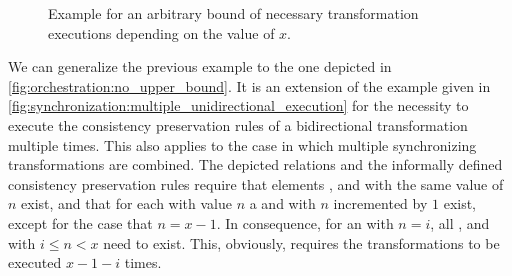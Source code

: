 \begin{figure}
    \centering
    
    \caption[Example for arbitrary bounds of transformation execution]{Example for an arbitrary bound of necessary transformation executions depending on the value of $x$.}
    \label{fig:orchestration:no_upper_bound}
\end{figure}

We can generalize the previous example to the one depicted in \autoref{fig:orchestration:no_upper_bound}.
It is an extension of the example given in \autoref{fig:synchronization:multiple_unidirectional_execution} for the necessity to execute the consistency preservation rules of a bidirectional transformation multiple times.
This also applies to the case in which multiple synchronizing transformations are combined.
The depicted relations and the informally defined consistency preservation rules require that elements ,  and  with the same value of $n$ exist, and that for each  with value $n$ a  and  with $n$ incremented by $1$ exist, except for the case that $n = x-1$.
In consequence, for an  with $n = i$, all ,  and  with $i \leq n < x$ need to exist.
This, obviously, requires the transformations to be executed $x-1-i$ times.

